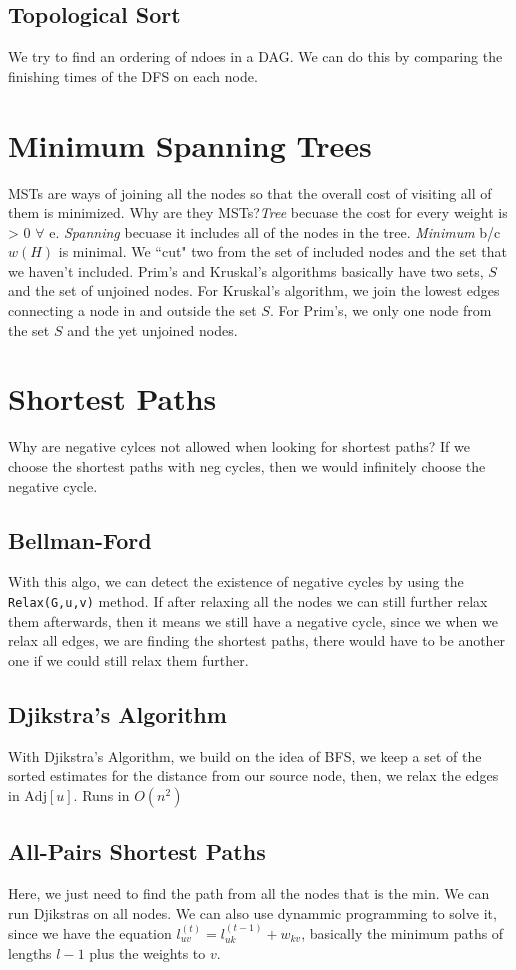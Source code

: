 \documentclass[landscape,4pt,a4paper]{article}
\begin{document}
\begin{multicols*}{5}
			\subsection{Topological Sort}
				We try to find an ordering of ndoes in a DAG. We can do this by comparing the finishing 
				times of the DFS on each node.
		\section{Minimum Spanning Trees}
				MSTs are ways of joining all the nodes so that the overall cost of visiting all of them is minimized.
				Why are they MSTs?\textit{Tree} becuase the cost for every weight is > 0 $\forall$ e. \textit{Spanning}
				becuase it includes all of the nodes in the tree.  \textit{Minimum} b/c $w(H)$ is minimal. We ``cut" two
				from the set of included nodes and the set that we haven't included. Prim's and Kruskal's algorithms 
				basically have two sets, $S$ and the set of unjoined nodes. For Kruskal's algorithm, we join the lowest
				edges connecting a node in and outside the set $S$. For Prim's, we only one node from the set $S$ and the 
				yet unjoined nodes.
		\section{Shortest Paths}
				Why are negative cylces not allowed when looking for shortest paths? If we choose the shortest paths with 
				neg cycles, then we would infinitely choose the negative cycle.
			\subsection{Bellman-Ford}
				With this algo, we can detect the existence of negative cycles by using the \texttt{Relax(G,u,v)} method.
				If after relaxing all the nodes we can still further relax them afterwards, then it means we still have a negative 
				cycle, since we when we relax all edges, we are finding the shortest paths, there would have to be another one if
				we could still relax them further. 
			\subsection{Djikstra's Algorithm}
				With Djikstra's Algorithm, we build on the idea of BFS, we keep a set of the sorted estimates for the distance
				from our source node, then, we relax the edges in $\text{Adj}[u]$. Runs in $O(n^{2})$
			\subsection{All-Pairs Shortest Paths}
				Here, we just need to find the path from all the nodes that is the min. We can run Djikstras on all nodes. 
				We can also use dynammic programming to solve it, since we have the equation 
				$l_{uv}^{(t)} = l_{uk}^{(t-1)} + w_{kv}$, basically the minimum paths of lengths $l-1$ plus the weights to $v$.

\end{multicols*}
\end{document}
